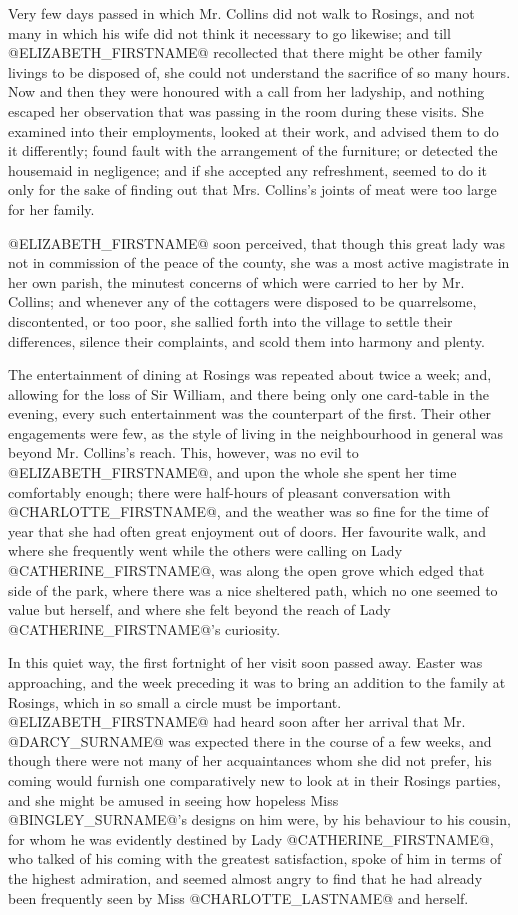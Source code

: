 Very few days passed in which Mr. Collins did not walk to Rosings, and
not many in which his wife did not think it necessary to go likewise;
and till @ELIZABETH_FIRSTNAME@ recollected that there might be other family livings
to be disposed of, she could not understand the sacrifice of so many
hours. Now and then they were honoured with a call from her ladyship,
and nothing escaped her observation that was passing in the room during
these visits. She examined into their employments, looked at their work,
and advised them to do it differently; found fault with the arrangement
of the furniture; or detected the housemaid in negligence; and if she
accepted any refreshment, seemed to do it only for the sake of finding
out that Mrs. Collins's joints of meat were too large for her family.

@ELIZABETH_FIRSTNAME@ soon perceived, that though this great lady was not in
commission of the peace of the county, she was a most active magistrate
in her own parish, the minutest concerns of which were carried to her
by Mr. Collins; and whenever any of the cottagers were disposed to
be quarrelsome, discontented, or too poor, she sallied forth into the
village to settle their differences, silence their complaints, and scold
them into harmony and plenty.

The entertainment of dining at Rosings was repeated about twice a week;
and, allowing for the loss of Sir William, and there being only one
card-table in the evening, every such entertainment was the counterpart
of the first. Their other engagements were few, as the style of living
in the neighbourhood in general was beyond Mr. Collins's reach. This,
however, was no evil to @ELIZABETH_FIRSTNAME@, and upon the whole she spent her time
comfortably enough; there were half-hours of pleasant conversation with
@CHARLOTTE_FIRSTNAME@, and the weather was so fine for the time of year that she had
often great enjoyment out of doors. Her favourite walk, and where she
frequently went while the others were calling on Lady @CATHERINE_FIRSTNAME@, was
along the open grove which edged that side of the park, where there was
a nice sheltered path, which no one seemed to value but herself, and
where she felt beyond the reach of Lady @CATHERINE_FIRSTNAME@'s curiosity.

In this quiet way, the first fortnight of her visit soon passed away.
Easter was approaching, and the week preceding it was to bring an
addition to the family at Rosings, which in so small a circle must be
important. @ELIZABETH_FIRSTNAME@ had heard soon after her arrival that Mr. @DARCY_SURNAME@ was
expected there in the course of a few weeks, and though there were not
many of her acquaintances whom she did not prefer, his coming would
furnish one comparatively new to look at in their Rosings parties, and
she might be amused in seeing how hopeless Miss @BINGLEY_SURNAME@'s designs on him
were, by his behaviour to his cousin, for whom he was evidently
destined by Lady @CATHERINE_FIRSTNAME@, who talked of his coming with the greatest
satisfaction, spoke of him in terms of the highest admiration, and
seemed almost angry to find that he had already been frequently seen by
Miss @CHARLOTTE_LASTNAME@ and herself.

